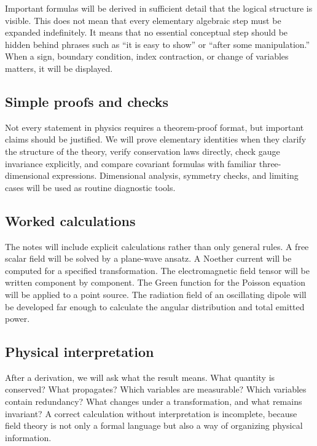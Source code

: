 Important formulas will be derived in sufficient detail that the logical structure is visible. This does not mean that every elementary algebraic step must be expanded indefinitely. It means that no essential conceptual step should be hidden behind phrases such as ``it is easy to show'' or ``after some manipulation.'' When a sign, boundary condition, index contraction, or change of variables matters, it will be displayed.

\subsection*{Simple proofs and checks}

Not every statement in physics requires a theorem-proof format, but important claims should be justified. We will prove elementary identities when they clarify the structure of the theory, verify conservation laws directly, check gauge invariance explicitly, and compare covariant formulas with familiar three-dimensional expressions. Dimensional analysis, symmetry checks, and limiting cases will be used as routine diagnostic tools.

\subsection*{Worked calculations}

The notes will include explicit calculations rather than only general rules. A free scalar field will be solved by a plane-wave ansatz. A Noether current will be computed for a specified transformation. The electromagnetic field tensor will be written component by component. The Green function for the Poisson equation will be applied to a point source. The radiation field of an oscillating dipole will be developed far enough to calculate the angular distribution and total emitted power.

\subsection*{Physical interpretation}

After a derivation, we will ask what the result means. What quantity is conserved? What propagates? Which variables are measurable? Which variables contain redundancy? What changes under a transformation, and what remains invariant? A correct calculation without interpretation is incomplete, because field theory is not only a formal language but also a way of organizing physical information.

